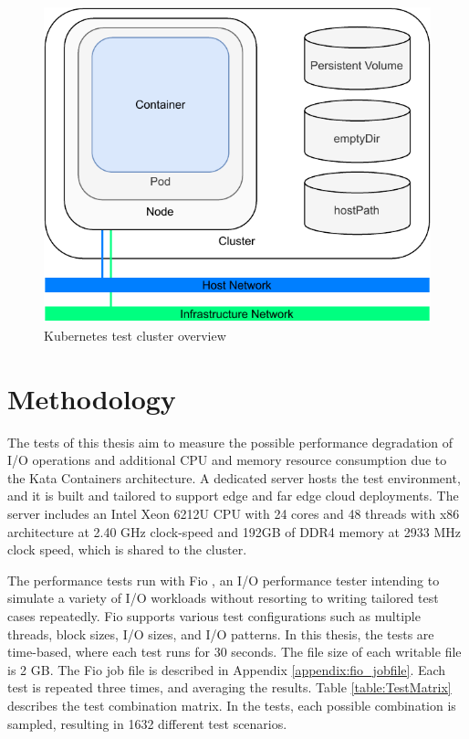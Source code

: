 \begin{figure}[ht]
  \begin{center}
    \includegraphics[width=12cm]{images/TestArchitectureClusterSimple.pdf}
    \caption{Kubernetes test cluster overview}
    \label{fig:TestArchitectureCluster}
  \end{center}
\end{figure}

\section{Methodology}

The tests of this thesis aim to measure the possible performance degradation of I/O operations and additional CPU and memory resource consumption due to the Kata Containers architecture. A dedicated server
hosts the test environment, and it is built and tailored to support edge and far edge cloud deployments. The server includes an Intel Xeon 6212U CPU with 24 cores and 48 threads with x86 architecture at 2.40 GHz clock-speed and 192GB of DDR4 memory at 2933 MHz clock speed, which is shared to the cluster.

The performance tests run with Fio \cite{FIO}, an I/O performance tester intending to simulate a variety of I/O workloads without resorting to writing tailored test cases repeatedly. Fio supports various test configurations such as multiple threads, block sizes, I/O sizes, and I/O patterns. In this thesis, the tests are time-based, where each test runs for 30 seconds. The file size of each writable file is 2 GB. The Fio job file is described in Appendix \ref{appendix:fio_jobfile}. Each test is repeated three times, and averaging the results. Table \ref{table:TestMatrix} describes the test combination matrix. In the tests, each possible combination is sampled, resulting in 1632 different test scenarios. 

